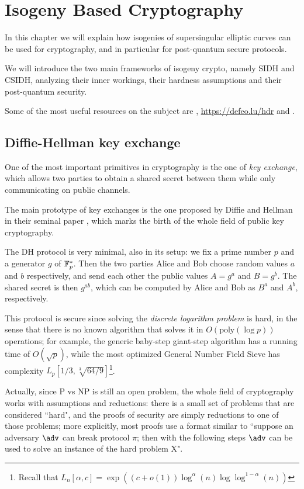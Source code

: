 \chapter{Isogeny Based Cryptography}

In this chapter we will explain how isogenies of supersingular elliptic curves can be used for cryptography, and in particular for post-quantum secure protocols.

We will introduce the two main frameworks of isogeny crypto, namely SIDH and CSIDH, analyzing their inner workings, their hardness assumptions and their post-quantum security.

Some of the most useful resources on the subject are \cite{DeFeo_intro}, \url{https://defeo.lu/hdr} and \cite{Galbraith_SIproblems}.

\section{Diffie-Hellman key exchange}

One of the most important primitives in cryptography is the one of \emph{key exchange}, which allows two parties to obtain a shared secret between them while only communicating on public channels.

The main prototype of key exchanges is the one proposed by Diffie and Hellman in their seminal paper \cite{DH}, which marks the birth of the whole field of public key cryptography.

The DH protocol is very minimal, also in its setup: we fix a prime number $p$ and a generator $g$ of $\mathbb{F}_p^\ast$. Then the two parties Alice and Bob choose random values $a$ and $b$ respectively, and send each other the public values $A=g^a$ and $B=g^b$. The shared secret is then $g^{ab}$, which can be computed by Alice and Bob as $B^a$ and $A^b$, respectively.

This protocol is secure since solving the \emph{discrete logarithm problem} is hard, in the sense that there is no known algorithm that solves it in $O(\text{poly}(\log p))$ operations; for example, the generic baby-step giant-step algorithm has a running time of $O(\sqrt p)$, while the most optimized General Number Field Sieve has complexity $L_p[1/3,\sqrt[3]{64/9}]$\footnote{Recall that $L_n[\alpha, c]=\exp\left( (c+o(1))\log^\alpha(n)\log\log^{1-\alpha}(n) \right)$}.

Actually, since P vs NP is still an open problem, the whole field of cryptography works with assumptions and reductions: there is a small set of problems that are considered ``hard", and the proofs of security are simply reductions to one of those problems; more explicitly, most proofs use a format similar to ``suppose an adversary $\adv$ can break protocol $\pi$; then with the following steps $\adv$ can be used to solve an instance of the hard problem X".

